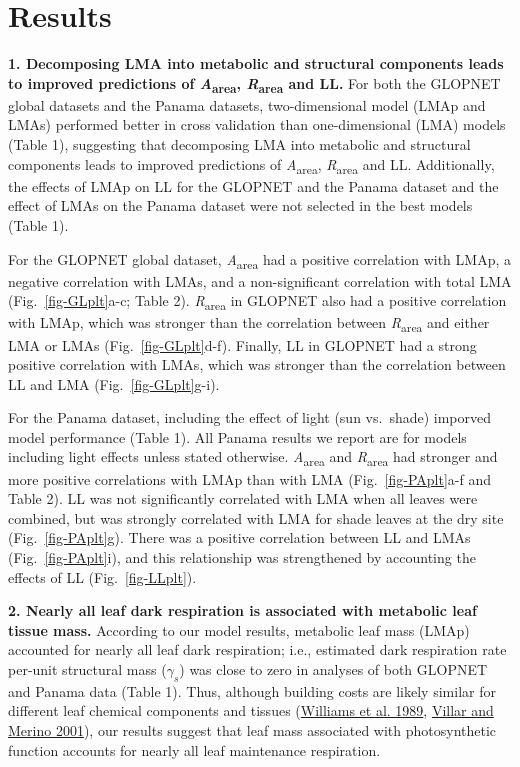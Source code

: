 \documentclass[
  12pt,
  a4paper,
,tablecaptionabove
]{scrartcl}
\begin{document}
\hypertarget{results}{%
\section{Results}\label{results}}

\textbf{1. Decomposing LMA into metabolic and structural components
leads to improved predictions of \emph{A}\textsubscript{area},
\emph{R}\textsubscript{area} and LL.} For both the GLOPNET global
datasets and the Panama datasets, two-dimensional model (LMAp and LMAs)
performed better in cross validation than one-dimensional (LMA) models
(Table 1), suggesting that decomposing LMA into metabolic and structural
components leads to improved predictions of
\emph{A}\textsubscript{area}, \emph{R}\textsubscript{area} and LL.
Additionally, the effects of LMAp on LL for the GLOPNET and the Panama
dataset and the effect of LMAs on the Panama dataset were not selected
in the best models (Table 1).

For the GLOPNET global dataset, \emph{A}\textsubscript{area} had a
positive correlation with LMAp, a negative correlation with LMAs, and a
non-significant correlation with total LMA (Fig.~\ref{fig-GLplt}a-c;
Table 2). \emph{R}\textsubscript{area} in GLOPNET also had a positive
correlation with LMAp, which was stronger than the correlation between
\emph{R}\textsubscript{area} and either LMA or LMAs
(Fig.~\ref{fig-GLplt}d-f). Finally, LL in GLOPNET had a strong positive
correlation with LMAs, which was stronger than the correlation between
LL and LMA (Fig.~\ref{fig-GLplt}g-i).

For the Panama dataset, including the effect of light (sun vs.~shade)
imporved model performance (Table 1). All Panama results we report are
for models including light effects unless stated otherwise.
\emph{A}\textsubscript{area} and \emph{R}\textsubscript{area} had
stronger and more positive correlations with LMAp than with LMA
(Fig.~\ref{fig-PAplt}a-f and Table 2). LL was not significantly
correlated with LMA when all leaves were combined, but was strongly
correlated with LMA for shade leaves at the dry site
(Fig.~\ref{fig-PAplt}g). There was a positive correlation between LL and
LMAs (Fig.~\ref{fig-PAplt}i), and this relationship was strengthened by
accounting the effects of LL (Fig.~\ref{fig-LLplt}).

\textbf{2. Nearly all leaf dark respiration is associated with metabolic
leaf tissue mass.} According to our model results, metabolic leaf mass
(LMAp) accounted for nearly all leaf dark respiration; i.e., estimated
dark respiration rate per-unit structural mass (\(\gamma_s\)) was close
to zero in analyses of both GLOPNET and Panama data (Table 1). Thus,
although building costs are likely similar for different leaf chemical
components and tissues (\protect\hyperlink{ref-Williams1989}{Williams et
al. 1989}, \protect\hyperlink{ref-Villar2001}{Villar and Merino 2001}),
our results suggest that leaf mass associated with photosynthetic
function accounts for nearly all leaf maintenance respiration.
\end{document}
